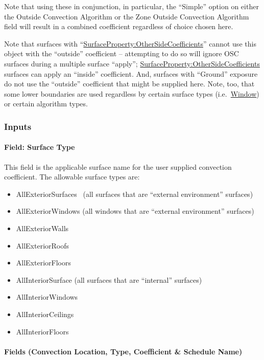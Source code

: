 Note that using these in conjunction, in particular, the ``Simple'' option on either the Outside Convection Algorithm or the Zone Outside Convection Algorithm field will result in a combined coefficient regardless of choice chosen here.

Note that surfaces with ``\hyperref[surfacepropertyothersidecoefficients]{SurfaceProperty:OtherSideCoefficients}'' cannot use this object with the ``outside'' coefficient -- attempting to do so will ignore OSC surfaces during a multiple surface ``apply''; \hyperref[surfacepropertyothersidecoefficients]{SurfaceProperty:OtherSideCoefficients} surfaces can apply an ``inside'' coefficient. And, surfaces with ``Ground'' exposure do not use the ``outside'' coefficient that might be supplied here. Note, too, that some lower boundaries are used regardless by certain surface types (i.e.~\hyperref[window]{Window}) or certain algorithm types.

\subsubsection{Inputs}\label{inputs-11}

\paragraph{Field: Surface Type}\label{field-surface-type-1}

This field is the applicable surface name for the user supplied convection coefficient. The allowable surface types are:

\begin{itemize}
\item
  AllExteriorSurfaces~ (all surfaces that are ``external environment'' surfaces)
\item
  AllExteriorWindows (all windows that are ``external environment'' surfaces)
\item
  AllExteriorWalls
\item
  AllExteriorRoofs
\item
  AllExteriorFloors
\item
  AllInteriorSurface (all surfaces that are ``internal'' surfaces)
\item
  AllInteriorWindows
\item
  AllInteriorCeilings
\item
  AllInteriorFloors
\end{itemize}

\paragraph{Fields (Convection Location, Type, Coefficient \& Schedule Name)}\label{fields-convection-location-type-coefficient-schedule-name-1}

